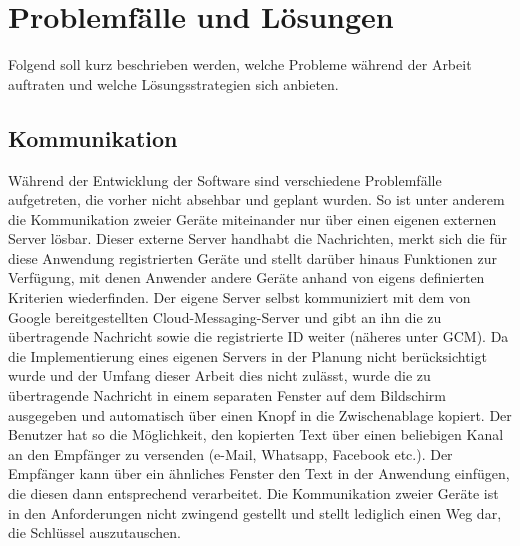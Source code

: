 \documentclass[10pt, a4paper,headsepline,pointednumbers]{scrreprt}
\begin{document}
\chapter{Problemfälle und Lösungen}
Folgend soll kurz beschrieben werden, welche Probleme während der Arbeit auftraten und welche Lösungsstrategien sich anbieten.


\section{Kommunikation}
Während der Entwicklung der Software sind verschiedene Problemfälle aufgetreten, die vorher nicht absehbar und geplant wurden. So ist unter anderem die Kommunikation zweier Geräte miteinander nur über einen eigenen externen Server lösbar. Dieser externe Server handhabt die Nachrichten, merkt sich die für diese Anwendung registrierten Geräte und stellt darüber hinaus Funktionen zur Verfügung, mit denen Anwender andere Geräte anhand von eigens definierten Kriterien wiederfinden. Der eigene Server selbst kommuniziert mit dem von Google bereitgestellten Cloud-Messaging-Server und gibt an ihn die zu übertragende Nachricht sowie die registrierte ID weiter (näheres unter GCM). Da die Implementierung eines eigenen Servers in der Planung nicht berücksichtigt wurde und der Umfang dieser Arbeit dies nicht zulässt, wurde die zu übertragende Nachricht in einem separaten Fenster auf dem Bildschirm ausgegeben und automatisch über einen Knopf in die Zwischenablage kopiert. Der Benutzer hat so die Möglichkeit, den kopierten Text über einen beliebigen Kanal an den Empfänger zu versenden (e-Mail, Whatsapp, Facebook etc.). Der Empfänger kann über ein ähnliches Fenster den Text in der Anwendung einfügen, die diesen dann entsprechend verarbeitet. Die Kommunikation zweier Geräte ist in den Anforderungen nicht zwingend gestellt und stellt lediglich einen Weg dar, die Schlüssel auszutauschen. 
\end{document}
